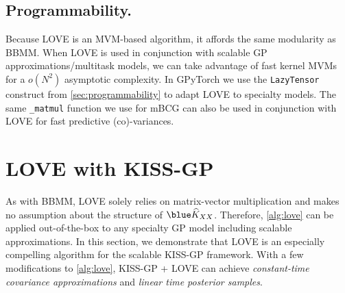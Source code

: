 \subsection{Programmability.}

Because LOVE is an MVM-based algorithm, it affords the same modularity as BBMM.
When LOVE is used in conjunction with scalable GP approximations/multitask models, we can take advantage of fast kernel MVMs for a $o(N^2)$ asymptotic complexity.
In GPyTorch we use the {\tt LazyTensor} construct from \cref{sec:programmability} to adapt LOVE to specialty models.
The same {\tt \_matmul} function we use for mBCG can also be used in conjunction with LOVE for fast predictive (co)-variances.





\section{LOVE with KISS-GP}
\label{sec:love_method_kissgp}



As with BBMM, LOVE solely relies on matrix-vector multiplication and makes no assumption about the structure of $\blue \trainK$.
Therefore, \cref{alg:love} can be applied out-of-the-box to any specialty GP model including scalable approximations.
In this section, we demonstrate that LOVE is an especially compelling algorithm for the scalable KISS-GP framework.
With a few modifications to \cref{alg:love}, KISS-GP + LOVE can achieve \emph{constant-time covariance approximations} and \emph{linear time posterior samples}.

